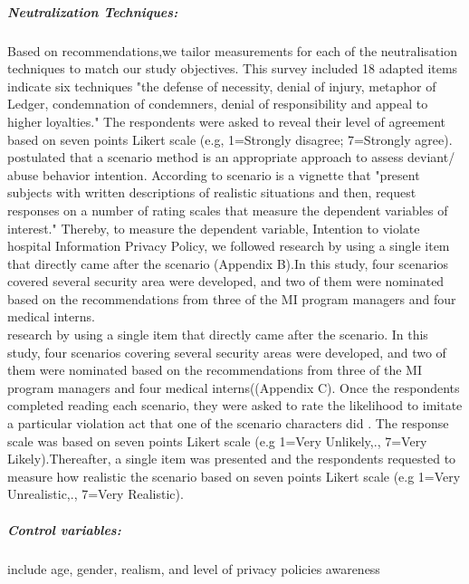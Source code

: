 \subparagraph{Neutralization Techniques:} Based on \cite{Siponen2010,Thurman1984} recommendations,we tailor measurements for each of the neutralisation techniques to match our study objectives. This survey included 18 adapted items indicate six techniques "the defense of necessity, denial of injury, metaphor of Ledger, condemnation of condemners, denial of responsibility and appeal to higher loyalties." The respondents were asked to reveal their level of agreement based on seven points Likert scale (e.g, 1=Strongly disagree; 7=Strongly agree). \\
\citet{Siponen2010} postulated that a scenario method is an appropriate approach to assess deviant/ abuse behavior intention. According to\cite{trevino1992experimental} scenario is a vignette that "present subjects with written descriptions of realistic situations and then, request responses on a number of rating scales that measure the dependent variables of interest." Thereby, to measure the dependent variable, Intention to violate hospital Information Privacy Policy, we followed \cite{Siponen2010,Teh2015} research by using a single item that  directly came after the scenario (Appendix B).In this study, four scenarios covered several security area were developed, and two of them were nominated based on the recommendations from three of the MI program managers and four medical interns. \\
research by using a single item that directly came after the scenario. In this study, four scenarios covering several security areas were developed, and two of them were nominated based on the recommendations from three of the MI program managers and four medical interns((Appendix C).
Once the respondents completed reading each scenario, they were asked to rate the likelihood to imitate a particular violation act that one of the scenario characters did \cite{Paternoster1996,Siponen2010}. The response scale was based on seven points Likert scale (e.g 1=Very Unlikely,., 7=Very Likely).Thereafter, a single item was presented and the respondents requested to measure how realistic the scenario based on seven points Likert scale (e.g 1=Very Unrealistic,., 7=Very Realistic).

\subparagraph {Control variables: } include age, gender, realism, and level of privacy policies awareness
 

